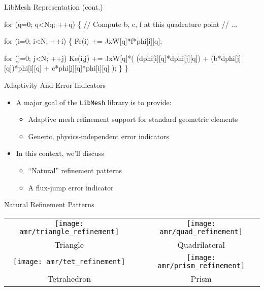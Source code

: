 

\begin{frame}[fragile]{LibMesh Representation (cont.)}
\small
\begin{semiverbatim}
  for (q=0; q<Nq; ++q) \{
    // Compute b, c, f at this quadrature point
    // ...

    for (i=0; i<N; ++i) \{
      Fe(i)   += JxW[q]*f*phi[i][q];

      for (j=0; j<N; ++j)
        Ke(i,j) += JxW[q]*(
          (dphi[i][q]*dphi[j][q])  +
          (b*dphi[j][q])*phi[i][q] +
           c*phi[j][q]*phi[i][q]
                          );
    \}
  \}
\end{semiverbatim}

\end{frame}





\begin{frame}{Adaptivity And Error Indicators}
  \begin{itemize}

  \item A major goal of the \texttt{LibMesh} library is to provide:
    \begin{itemize}
    \item Adaptive mesh refinement support for standard geometric elements
    \item Generic, physics-independent error indicators
  \end{itemize}

  \item In this context, we'll discuss
    \begin{itemize}
    \item ``Natural'' refinement patterns
    \item A flux-jump error indicator
  \end{itemize}


  \end{itemize}
\end{frame}




\begin{frame}{Natural Refinement Patterns}
  \begin{tabular}{ccc}\\
    \texttt{[image: amr/triangle\_refinement]} &&
    \texttt{[image: amr/quad\_refinement]} \\
    Triangle && Quadrilateral \\
    \texttt{[image: amr/tet\_refinement]} &&
    \texttt{[image: amr/prism\_refinement]}  \\
    Tetrahedron && Prism
  \end{tabular}
\end{frame}


